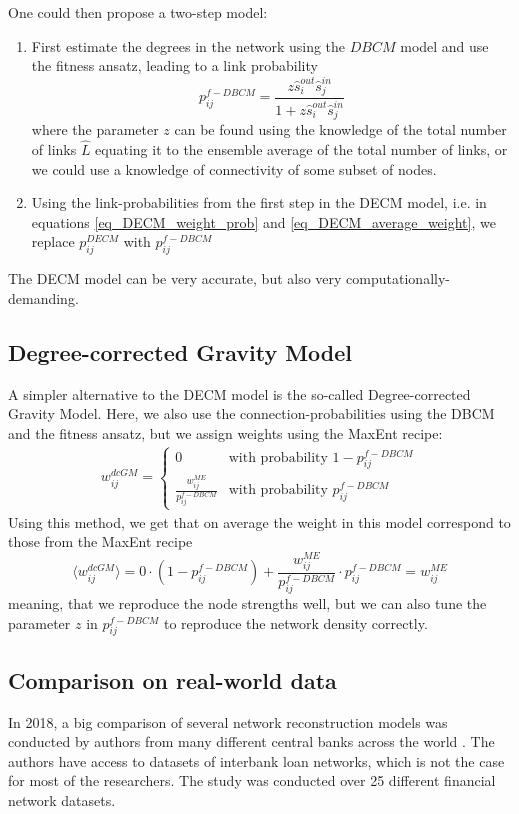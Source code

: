 One could then propose a two-step model:
\begin{enumerate}
    \item First estimate the degrees in the network using the $DBCM$ model and use the fitness ansatz, leading to a link probability
    \begin{equation}
        p_{ij}^{f-DBCM} = \frac{z\hat{s}_i^{out} \hat{s}_j^{in}}{1 + z\hat{s}_i^{out} \hat{s}_j^{in}}
    \end{equation}
    where the parameter $z$ can be found using the knowledge of the total number of links $\hat{L}$ equating it to the ensemble average of the total number of links, or we could use a knowledge of connectivity of some subset of nodes. 
    \item Using the link-probabilities from the first step in the DECM model, i.e. in equations \ref{eq_DECM_weight_prob} and \ref{eq_DECM_average_weight}, we replace $p_{ij}^{DECM}$ with $p_{ij}^{f-DBCM}$
\end{enumerate}
The DECM model can be very accurate, but also very computationally-demanding. 
\subsection{Degree-corrected Gravity Model}
\label{sec_DCGM}
A simpler alternative to the DECM model is the so-called Degree-corrected Gravity Model. Here, we also use the connection-probabilities using the DBCM and the fitness ansatz, but we assign weights using the MaxEnt recipe:
\begin{align}
    w_{ij}^{dcGM} = \begin{cases}
        0 \qquad &\text{with probability } 1 - p_{ij}^{f-DBCM}\\
        \frac{w_{ij}^{ME}}{p_{ij}^{f-DBCM}} &\text{with probability } p_{ij}^{f-DBCM}
    \end{cases}
\end{align}
Using this method, we get that on average the weight in this model correspond to those from the MaxEnt recipe
\begin{equation}
    \langle w_{ij}^{dcGM} \rangle = 0\cdot (1 - p_{ij}^{f-DBCM}) + \frac{w_{ij}^{ME}}{p_{ij}^{f-DBCM}}\cdot p_{ij}^{f-DBCM} = w_{ij}^{ME}
\end{equation} meaning, that we reproduce the node strengths well, but we can also tune the parameter $z$ in $p_{ij}^{f-DBCM}$ to reproduce the network density correctly.

\subsection{Comparison on real-world data}
In 2018, a big comparison of several network reconstruction models was conducted by authors from many different central banks across the world \cite{Anand2018}. The authors have access to datasets of interbank loan networks, which is not the case for most of the researchers. The study was conducted over 25 different financial network datasets.

